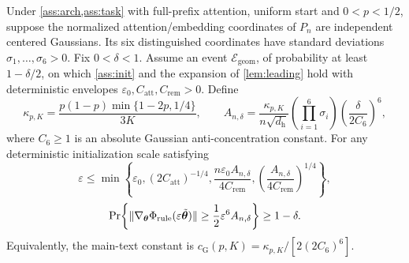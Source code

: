 \begin{proposition}
\label{lem:quant-rule-gradient}
Under \cref{ass:arch,ass:task} with full-prefix attention, uniform start and
$0<p<1/2$, suppose the normalized attention/embedding coordinates of $P_n$
are independent centered Gaussians. Its six distinguished coordinates have
standard deviations $\sigma_1,\ldots,\sigma_6>0$. Fix $0<\delta<1$.
Assume an event $\mathcal E_{\mathrm{geom}}$, of probability at least
$1-\delta/2$, on which \cref{ass:init} and the expansion of
\cref{lem:leading} hold with deterministic envelopes
$\varepsilon_0,C_{\mathrm{att}},C_{\mathrm{rem}}>0$. Define
\begin{equation}\label{eq:t2-gaussian-threshold}
 \kappa_{p,K}=\frac{p(1-p)\min\{1-2p,1/4\}}{3K},\qquad
 A_{n,\delta}=\frac{\kappa_{p,K}}{n\sqrt{d_{\mathrm h}}}
 \left(\prod_{i=1}^6\sigma_i\right)
 \left(\frac{\delta}{2C_6}\right)^6,
\end{equation}
where $C_6\ge1$ is an absolute Gaussian anti-concentration constant.
For any deterministic initialization scale satisfying
\begin{equation}\label{eq:t2-gaussian-epsilon}
 \varepsilon\le\min\left\{\varepsilon_0,(2C_{\mathrm{att}})^{-1/4},
 \frac{n\varepsilon_0 A_{n,\delta}}{4C_{\mathrm{rem}}},
 \left(\frac{A_{n,\delta}}{4C_{\mathrm{rem}}}\right)^{1/4}\right\},
\end{equation}
\begin{equation}\label{eq:t2-gaussian-credit}
 \Pr\!\left\{\|\nabla_{\bm\theta}\rulecredit
 (\varepsilon\tilde{\bm\theta})\|
 \ge\tfrac12\varepsilon^6 A_{n,\delta}\right\}\ge1-\delta.
\end{equation}
Equivalently, the main-text constant is
$c_{\mathrm G}(p,K)=\kappa_{p,K}/[2(2C_6)^6]$.

\end{proposition}
